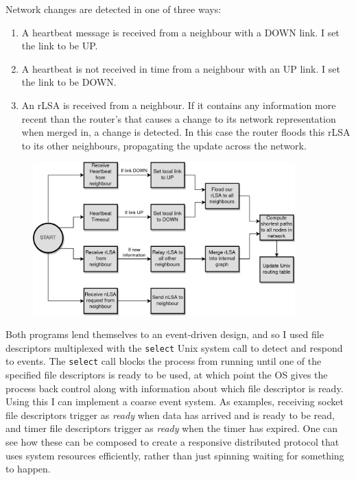\documentclass[withindex,glossary,openany]{cam-thesis}
\begin{document}
Network changes are detected in one of three ways:
\begin{enumerate}
	\item
	A heartbeat message is received from a neighbour with a DOWN link. I set the link to be UP.
	
	\item
	A heartbeat is not received in time from a neighbour with an UP link. I set the link to be DOWN.
	
	\item
	An rLSA is received from a neighbour. If it contains any information more recent than the router's that causes a change to its network representation when merged in, a change is detected. In this case the router floods this rLSA to its other neighbours, propagating the update across the network.
\end{enumerate}

\begin{figure} \centering
	\includegraphics[width=0.9\textwidth]{flowchart_lsr}
	\label{fig:flowchart_lsr}
\end{figure}

Both programs lend themselves to an event-driven design, and so I used file descriptors multiplexed with the \texttt{select} Unix system call to detect and respond to events. The \texttt{select} call blocks the process from running until one of the specified file descriptors is ready to be used, at which point the OS gives the process back control along with information about which file descriptor is ready. Using this I can implement a coarse event system. As examples, receiving socket file descriptors trigger as \textit{ready} when data has arrived and is ready to be read, and timer file descriptors trigger as \textit{ready} when the timer has expired. One can see how these can be composed to create a responsive distributed protocol that uses system resources efficiently, rather than just spinning waiting for something to happen.
\end{document}
